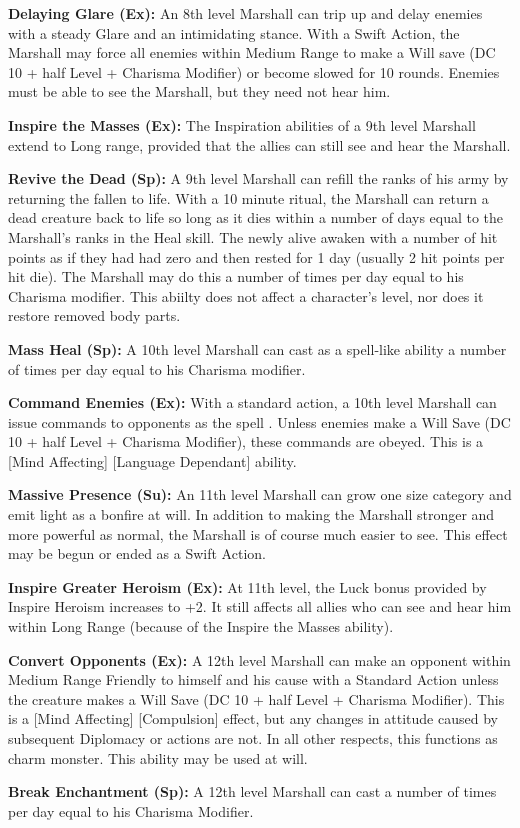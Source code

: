 \textbf{Delaying Glare (Ex):} An 8th level Marshall can trip up and delay enemies with a steady Glare and an intimidating stance. With a Swift Action, the Marshall may force all enemies within Medium Range to make a Will save (DC 10 + half Level + Charisma Modifier) or become slowed for 10 rounds. Enemies must be able to see the Marshall, but they need not hear him.

\textbf{Inspire the Masses (Ex):} The Inspiration abilities of a 9th level Marshall extend to Long range, provided that the allies can still see and hear the Marshall.

\textbf{Revive the Dead (Sp):} A 9th level Marshall can refill the ranks of his army by returning the fallen to life. With a 10 minute ritual, the Marshall can return a dead creature back to life so long as it dies within a number of days equal to the Marshall's ranks in the Heal skill. The newly alive awaken with a number of hit points as if they had had zero and then rested for 1 day (usually 2 hit points per hit die). The Marshall may do this a number of times per day equal to his Charisma modifier. This abiilty does not affect a character's level, nor does it restore removed body parts.

\textbf{Mass Heal (Sp):} A 10th level Marshall can cast  as a spell-like ability a number of times per day equal to his Charisma modifier.

\textbf{Command Enemies (Ex):} With a standard action, a 10th level Marshall can issue commands to opponents as the spell . Unless enemies make a Will Save (DC 10 + half Level + Charisma Modifier), these commands are obeyed. This is a [Mind Affecting] [Language Dependant] ability.

\textbf{Massive Presence (Su):} An 11th level Marshall can grow one size category and emit light as a bonfire at will. In addition to making the Marshall stronger and more powerful as normal, the Marshall is of course much easier to see. This effect may be begun or ended as a Swift Action.

\textbf{Inspire Greater Heroism (Ex):} At 11th level, the Luck bonus provided by Inspire Heroism increases to +2. It still affects all allies who can see and hear him within Long Range (because of the Inspire the Masses ability).

\textbf{Convert Opponents (Ex):} A 12th level Marshall can make an opponent within Medium Range Friendly to himself and his cause with a Standard Action unless the creature makes a Will Save (DC 10 + half Level + Charisma Modifier). This is a [Mind Affecting] [Compulsion] effect, but any changes in attitude caused by subsequent Diplomacy or actions are not. In all other respects, this functions as charm monster. This ability may be used at will.

\textbf{Break Enchantment (Sp):} A 12th level Marshall can cast  a number of times per day equal to his Charisma Modifier.
